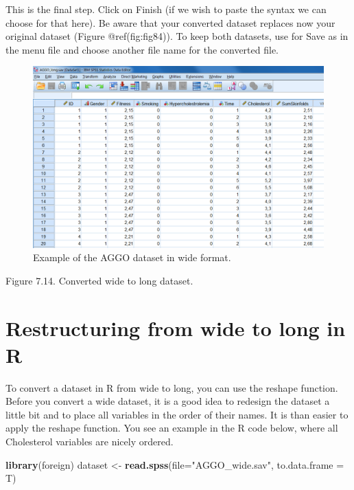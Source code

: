 \documentclass[
]{book}
\newenvironment{Shaded}{\begin{snugshade}}{\end{snugshade}}
\newcommand{\DataTypeTok}[1]{\textcolor[rgb]{0.13,0.29,0.53}{#1}}
\newcommand{\KeywordTok}[1]{\textcolor[rgb]{0.13,0.29,0.53}{\textbf{#1}}}
\newcommand{\NormalTok}[1]{#1}
\newcommand{\StringTok}[1]{\textcolor[rgb]{0.31,0.60,0.02}{#1}}
\begin{document}
This is the final step. Click on Finish (if we wish to paste the syntax
we can choose for that here). Be aware that your converted dataset
replaces now your original dataset (Figure @ref(fig:fig84)). To keep
both datasets, use for Save as in the menu file and choose another file
name for the converted file.

\begin{figure}

{\centering \includegraphics[width=0.9\linewidth]{images/fig7.14} 

}

\caption{Example of the AGGO dataset in wide format.}\label{fig:fig84}
\end{figure}

Figure 7.14. Converted wide to long dataset.

\hypertarget{restructuring-from-wide-to-long-in-r}{%
\section{Restructuring from wide to long in
R}\label{restructuring-from-wide-to-long-in-r}}

To convert a dataset in R from wide to long, you can use the reshape
function. Before you convert a wide dataset, it is a good idea to
redesign the dataset a little bit and to place all variables in the
order of their names. It is than easier to apply the reshape function.
You see an example in the R code below, where all Cholesterol variables
are nicely ordered.

\begin{Shaded}
\begin{Highlighting}[]
\KeywordTok{library}\NormalTok{(foreign)}
\NormalTok{dataset <-}\StringTok{ }\KeywordTok{read.spss}\NormalTok{(}\DataTypeTok{file=}\StringTok{"AGGO_wide.sav"}\NormalTok{, }\DataTypeTok{to.data.frame =}\NormalTok{ T)}
\end{Highlighting}
\end{Shaded}
\end{document}

